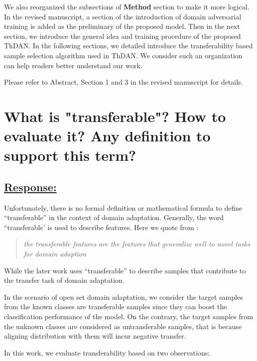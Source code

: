 We also reorganized the subsections of \textbf{Method} section to make it more logical.
In the revised manuscript, a section of the introduction of domain adversarial training \cite{DomainAdversrialNetwork} is added as the preliminary of the proposed model.
Then in the next section, we introduce the general idea and training procedure of the proposed ThDAN.
In the following sections, we detailed introduce the transferability based sample selection algorithm used in ThDAN.
We consider such an organization can help readers better understand our work.

Please refer to Abstract, Section 1 and 3 in the revised manuscript for details.


\section{
    What is "transferable"? How to evaluate it? Any definition to support this term?
}
\label{question: transferable}

\subsection*{\underline{\textbf{Response:}}}


Unfortunately, there is no formal definition or mathematical formula to define ``transferable'' in the context of domain adaptation. 
Generally, the word ``transferable' is used to describe features. 
Here we quote from \cite{DeepAdaptationNetworks}:
\begin{quote}
    \textit{the transferable features are the features that generalize well to novel tasks for domain adaption}
\end{quote}
While the later work \cite{TransferableAttentionDA} uses ``transferable'' to describe samples that contribute to the transfer task of domain adaptation. 

In the scenario of open set domain adaptation, we consider the target samples from the known classes are transferable samples since they can boost the classification performance of the model.  
On the contrary, the target samples from the unknown classes are considered as untransferable samples, that is because aligning distribution with them will incur negative transfer. 

In this work, we evaluate transferability based on two observations:

